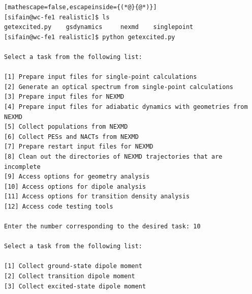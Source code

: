 \documentclass[letterpaper,12pt,titlepage]{article}
\begin{document}
\begin{lstlisting}[mathescape=false,escapeinside={(*@}{@*)}]
[sifain@wc-fe1 realistic]$ ls
getexcited.py    gsdynamics     nexmd    singlepoint
[sifain@wc-fe1 realistic]$ python getexcited.py 

Select a task from the following list:

[1] Prepare input files for single-point calculations
[2] Generate an optical spectrum from single-point calculations
[3] Prepare input files for NEXMD
[4] Prepare input files for adiabatic dynamics with geometries from NEXMD
[5] Collect populations from NEXMD
[6] Collect PESs and NACTs from NEXMD
[7] Prepare restart input files for NEXMD
[8] Clean out the directories of NEXMD trajectories that are incomplete
[9] Access options for geometry analysis
[10] Access options for dipole analysis
[11] Access options for transition density analysis
[12] Access code testing tools

Enter the number corresponding to the desired task: 10

Select a task from the following list:

[1] Collect ground-state dipole moment
[2] Collect transition dipole moment
[3] Collect excited-state dipole moment


\end{lstlisting}
\end{document}
